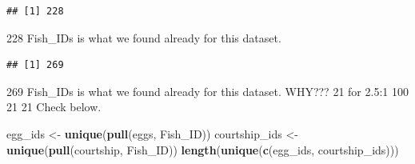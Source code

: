 \documentclass[]{book}
\newenvironment{Shaded}{\begin{snugshade}}{\end{snugshade}}
\newcommand{\DataTypeTok}[1]{\textcolor[rgb]{0.13,0.29,0.53}{#1}}
\newcommand{\KeywordTok}[1]{\textcolor[rgb]{0.13,0.29,0.53}{\textbf{#1}}}
\newcommand{\NormalTok}[1]{#1}
\newcommand{\OperatorTok}[1]{\textcolor[rgb]{0.81,0.36,0.00}{\textbf{#1}}}
\newcommand{\StringTok}[1]{\textcolor[rgb]{0.31,0.60,0.02}{#1}}
\begin{document}
\begin{Shaded}
\end{Shaded}

\begin{verbatim}
## [1] 228
\end{verbatim}

228 Fish\_IDs is what we found already for this dataset.

\begin{Shaded}
\end{Shaded}

\begin{verbatim}
## [1] 269
\end{verbatim}

269 Fish\_IDs is what we found already for this dataset.
WHY??? 21 for 2.5:1 100 21 21
Check below.

\begin{Shaded}
\begin{Highlighting}[]
\NormalTok{egg_ids <-}\StringTok{ }\KeywordTok{unique}\NormalTok{(}\KeywordTok{pull}\NormalTok{(eggs, Fish_ID))}
\NormalTok{courtship_ids <-}\StringTok{ }\KeywordTok{unique}\NormalTok{(}\KeywordTok{pull}\NormalTok{(courtship, Fish_ID))}
\KeywordTok{length}\NormalTok{(}\KeywordTok{unique}\NormalTok{(}\KeywordTok{c}\NormalTok{(egg_ids, courtship_ids)))}
\end{Highlighting}
\end{Shaded}
\end{document}
